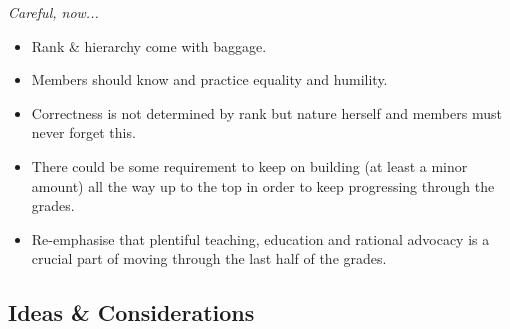 \documentclass[9pt,oneside]{amsart}
\begin{document}
\emph{Careful, now...}
\begin{itemize}
  \item Rank \& hierarchy come with baggage.
  \item Members should know and practice equality and humility.
  \item Correctness is not determined by rank but nature herself and members must never forget this.
  \item There could be some requirement to keep on building (at least a minor amount) all the way up to the top in order to keep progressing through the grades.
  \item Re-emphasise that plentiful teaching, education and rational advocacy is a crucial part of moving through the last half of the grades.
\end{itemize}

\subsection{Ideas \& Considerations}\label{ideas-considerations}
\end{document}
